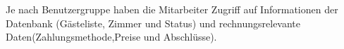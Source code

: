 \documentclass[../../Pflichtenheft.tex]{subfiles}
\begin{document}
    Je nach Benutzergruppe haben die Mitarbeiter Zugriff auf Informationen der Datenbank (Gästeliste, Zimmer und Status) und rechnungsrelevante Daten(Zahlungsmethode,Preise und Abschlüsse).
\end{document}
